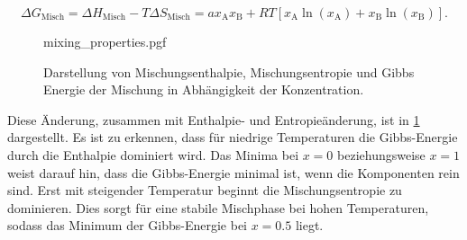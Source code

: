 \begin{equation}
    \Delta G_{\mathrm{Misch}}=\Delta H_{\mathrm{Misch}}-T\Delta S_{\mathrm{Misch}}=a x_{\mathrm{A}} x_{\mathrm{B}}
    +RT[x_{\mathrm{A}}\ln(x_{\mathrm{A}})+x_{\mathrm{B}}\ln(x_{\mathrm{B}})].
    \label{eq:mischgibbs}
\end{equation}

\begin{figure}
    \centering
    {mixing_properties.pgf}
    \caption{Darstellung von Mischungsenthalpie, Mischungsentropie und Gibbs Energie der Mischung in Abhängigkeit der
    Konzentration.
    }
    \label{fig:mixing_properties}
\end{figure}

Diese Änderung, zusammen mit Enthalpie- und Entropieänderung, ist in \cref{fig:mixing_properties} dargestellt.
Es ist zu erkennen, dass für niedrige Temperaturen die Gibbs-Energie durch die Enthalpie dominiert wird.
Das Minima bei $x=0$ beziehungsweise $x=1$ weist darauf hin, dass die Gibbs-Energie minimal ist, wenn die
Komponenten rein sind.
Erst mit steigender Temperatur beginnt die Mischungsentropie zu dominieren.
Dies sorgt für eine stabile Mischphase bei hohen Temperaturen, sodass das Minimum der Gibbs-Energie bei $x=0.5$ liegt.